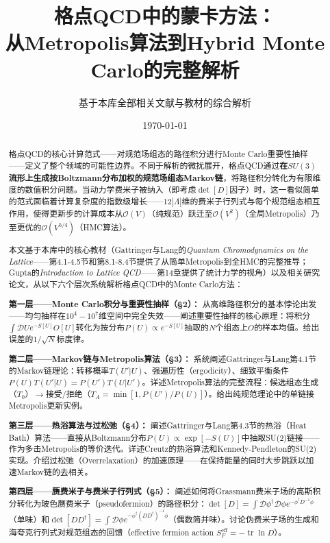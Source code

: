 \documentclass[12pt,a4paper]{ctexart}
\title{\heiti 格点QCD中的蒙卡方法：\\
从Metropolis算法到Hybrid Monte Carlo的完整解析}
\author{基于本库全部相关文献与教材的综合解析}
\date{\today}
\theoremstyle{definition}
\begin{document}
\maketitle

\begin{abstract}
\noindent
格点QCD的核心计算范式——对规范场组态的路径积分进行Monte Carlo重要性抽样——定义了整个领域的可能性边界。不同于解析的微扰展开，格点QCD通过\textbf{在$SU(3)$流形上生成按Boltzmann分布加权的规范场组态Markov链}，将路径积分转化为有限维度的数值积分问题。当动力学费米子被纳入（即考虑$\det[D]$因子）时，这一看似简单的范式面临着计算复杂度的指数级增长——$12|\Lambda|$维的费米子行列式与每个规范组态相互作用，使得更新步的计算成本从$\mathcal{O}(V)$（纯规范）跃迁至$\mathcal{O}(V^2)$（全局Metropolis）乃至更优的$\mathcal{O}(V^{5/4})$（HMC算法）。

本文基于本库中的核心教材（Gattringer与Lang的\textit{Quantum Chromodynamics on the Lattice}——第4.1-4.5节和第8.1-8.4节提供了从简单Metropolis到全HMC的完整推导；Gupta的\textit{Introduction to Lattice QCD}——第14章提供了统计力学的视角）以及相关研究论文，从以下六个层次系统解析格点QCD中的Monte Carlo方法：

\textbf{第一层——Monte Carlo积分与重要性抽样（§2）：}
从高维路径积分的基本悖论出发——均匀抽样在$10^4-10^7$维空间中完全失效——阐述重要性抽样的核心原理：将积分$\int \mathcal{D}U e^{-S[U]} O[U]$转化为按分布$P(U) \propto e^{-S[U]}$抽取的$N$个组态上$O$的样本均值。给出误差的$1/\sqrt{N}$标度律。

\textbf{第二层——Markov链与Metropolis算法（§3）：}
系统阐述Gattringer与Lang第4.1节的Markov链理论：转移概率$T(U'|U)$、强遍历性（ergodicity）、细致平衡条件$P(U) T(U'|U) = P(U') T(U|U')$。详述Metropolis算法的完整流程：候选组态生成（$T_0$）$\to$接受/拒绝（$T_A = \min[1, P(U')/P(U)]$）。给出纯规范理论中的单链接Metropolis更新实例。

\textbf{第三层——热浴算法与过松弛（§4）：}
阐述Gattringer与Lang第4.3节的热浴（Heat Bath）算法——直接从Boltzmann分布$P(U) \propto \exp[-S(U)]$中抽取SU(2)链接——作为多击Metropolis的等价迭代。详述Creutz的热浴算法和Kennedy-Pendleton的SU(2)实现。介绍过松弛（Overrelaxation）的加速原理——在保持能量的同时大步跳跃以加速Markov链的去相关。

\textbf{第四层——赝费米子与费米子行列式（§5）：}
阐述如何将Grassmann费米子场的高斯积分转化为玻色赝费米子（pseudofermion）的路径积分：$\det[D] = \int \mathcal{D}\phi^\dagger\mathcal{D}\phi e^{-\phi^\dagger D^{-1} \phi}$（单味）和$\det[DD^\dagger] = \int \mathcal{D}\phi e^{-\phi^\dagger (DD^\dagger)^{-1}\phi}$（偶数简并味）。讨论伪费米子场的生成和海夸克行列式对规范组态的回馈（effective fermion action $S_F^{\text{eff}} = -\operatorname{tr}\ln D$）。


\end{abstract}
\end{document}

